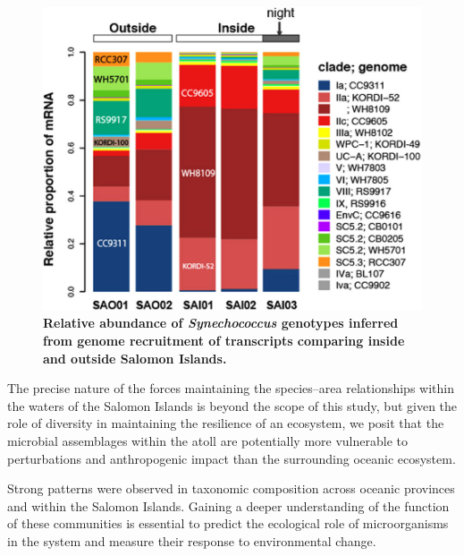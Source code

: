 \begin{figure}
    \centering
    \includegraphics[width=\textwidth]{Chagos/figures/fig6}
    \caption{\textbf{Relative abundance of {\em Synechococcus} genotypes inferred from genome recruitment of transcripts comparing inside and outside Salomon Islands.}}
    \label{Chagos_fig6}
\end{figure}

The precise nature of the forces maintaining the species–area relationships within the waters of the Salomon Islands is beyond the scope of this study, but given the role of diversity in maintaining the resilience of an ecosystem, \cite{elmqvist_response_2003} we posit that the microbial assemblages within the atoll are potentially more vulnerable to perturbations and anthropogenic impact than the surrounding oceanic ecosystem.

Strong patterns were observed in taxonomic composition across oceanic provinces and within the Salomon Islands. Gaining a deeper understanding of the function of these communities is essential to predict the ecological role of microorganisms in the system and measure their response to environmental change.